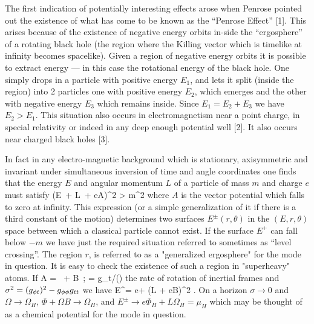 The first indication of potentially interesting effects arose when Penrose pointed out 
the existence of what has come to be known as the ``Penrose Effect'' [1]. 
This arises because of the existence of negative energy orbits in-side the ``ergosphere''
of a rotating black hole (the region where the Killing vector which is timelike at
infinity becomes spacelike). Given a region of negative energy orbits it is possible to
extract energy --- in this case the rotational energy of the black hole. 
One simply drops in a particle with positive energy $E_1$, and lets it split (inside the region) into 
2 particles one with positive energy
$E_2$, which emerges and the other with negative energy $E_3$ which remains inside.
Since $E_1 = E_2 + E_3$ we have $E_2 > E_1$. This situation also occurs in electromagnetism
near a point charge, in special relativity or indeed in any deep enough potential well [2].
It also occurs near charged black holes [3].

In fact in any electro-magnetic background which is stationary, axisymmetric and
invariant under simultaneous inversion of time and angle coordinates one finds that the
energy $E$ and angular momentum $L$ of a particle of mass $m$ and charge $e$ must satisfy
\be
(E\, \dt + L\, \dphi + eA)^2 > m^2
\ee
where $A$ is the vector potential which falls to zero at infinity.
This expression (or a simple generalization of it if there is a third constant of the motion)
determines two surfaces $E^{\pm} (r,\theta)$ in the $(E, r, \theta)$ space between which
a classical particle cannot exist. If the surface $E^+$ can fall below $- m$ we have just the
required situation referred to sometimes as ``level crossing''. The region $r$,
is referred to as a "generalized ergosphere" for the mode in question.
It is easy to check the existence of such a region in "superheavy" atoms. If
\be
A = \Phi\, \dt + B\, \dphi; \quad \Omega = g_{\phi t}/(\gtt)
\ee
the rate of rotation of inertial frames and $\sigma^2 = (g_{\phi t})^2 - g_{\phi\phi}g_{tt}$ we have
\be
E^\pm = e\Phi + (L + eB)\Omega \pm \sigma^2  .
\ee
\ni
On a horizon $\sigma\rightarrow 0$ and $\Omega \rightarrow \Omega_H$, $\Phi + \Omega B \rightarrow \Omega_H$, and
$E^\pm \rightarrow e \Phi_H + L \Omega_H = \mu_H$
which may be thought of as a chemical potential for the mode in question.


